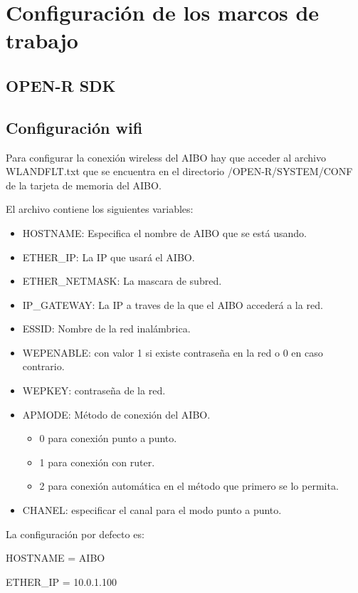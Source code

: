 \documentclass[12pt,a4paper,final,twoside]{article}
\begin{document}
\label{Referencies}
%

\appendix
\clearpage %
\addappheadtotoc
\appendixpage
\section{Configuración de los marcos de trabajo }\label{marcos}
\subsection{OPEN-R SDK}
\subsection{Configuración wifi}
Para configurar la conexión wireless del AIBO hay que acceder al archivo WLANDFLT.txt que se encuentra en el directorio /OPEN-R/SYSTEM/CONF de la tarjeta de memoria del AIBO.

El archivo contiene los siguientes variables:
\begin{itemize}
\item HOSTNAME: Especifica el nombre de AIBO que se está usando.
\item ETHER{\_}IP: La IP que usará el AIBO.
\item ETHER{\_}NETMASK: La mascara de subred.
\item IP{\_}GATEWAY: La IP a traves de la que el AIBO accederá a la red.
\item ESSID: Nombre de la red inalámbrica.
\item WEPENABLE: con valor 1 si existe contraseña en la red o 0 en caso contrario.
\item WEPKEY: contraseña de la red.
\item APMODE: Método de conexión del AIBO.
\begin{itemize}
\item 0 para conexión punto a punto.
\item 1 para conexión con ruter.
\item 2 para conexión automática en el método que primero se lo permita.
\end{itemize}
\item CHANEL: especificar el canal para el modo punto a punto.
\end{itemize}
La configuración por defecto es:

HOSTNAME = AIBO

ETHER{\_}IP = 10.0.1.100
\end{document}
